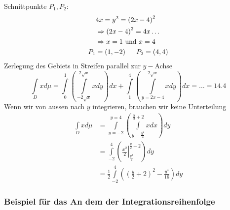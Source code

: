 \begin{enumerate}
Schnittpunkte $P_1,P_2$:
\begin{align*}
&4x=y^2=\left( 2x-4\right)^2\\
&\Rightarrow\left( 2x-4\right)^2=4x\dots\\
&\Rightarrow x=1 \text{ und } x=4\\
P_1&=\left(1,-2\right)\hspace{5mm}P_2=\left(4,4\right)
\end{align*}
Zerlegung des Gebiets in Streifen parallel zur $y-$Achse
\[\int\limits_D {xd\mu  = \int\limits_0^1 {\left( {\int\limits_{ - 2\sqrt x }^{2\sqrt x } {xdy} } \right)dx} }  + \int\limits_1^4 {\left( {\int\limits_{y = 2x - 4}^{2\sqrt x } {xdy} } \right)} dx =  \ldots  = 14.4\]
Wenn wir von aussen nach $y$ integrieren, brauchen wir keine Unterteilung
\begin{align*}
\int\limits_D xd\mu  &=\int\limits_{y =  - 2}^{y = 4} {\left( {\int\limits_{y = \frac{{{y^2}}}{4}}^{\frac{y}{2} + 2} {xdx} }\right)dy} \\
 &=\int\limits_{ - 2}^4 {\left( {\left. {\frac{{{x^2}}}{2}} \right|_{\frac{{{y^2}}}{4}}^{\frac{y}{2} + 2}} \right)dy}\\
&=\frac{1}{2}\int\limits_{ - 2}^4 {\left( {{{\left( {\frac{y}{2} + 2} \right)}^2} - \frac{{{y^4}}}{{16}}} \right)dy}
\end{align*}
\end{enumerate}

\subsubsection*{Beispiel für das An dem der Integrationsreihenfolge}
